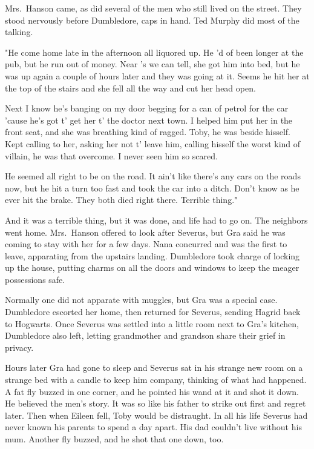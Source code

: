 Mrs.~Hanson came, as did several of the men who still lived on the street. They stood nervously before Dumbledore, caps in hand. Ted Murphy did most of the talking.

"He come home late in the afternoon all liquored up. He 'd of been longer at the pub, but he run out of money. Near 's we can tell, she got him into bed, but he was up again a couple of hours later and they was going at it. Seems he hit her at the top of the stairs and she fell all the way and cut her head open.

\textooquote Next I know he's banging on my door begging for a can of petrol for the car 'cause he's got t' get her t' the doctor next town. I helped him put her in the front seat, and she was breathing kind of ragged. Toby, he was beside hisself. Kept calling to her, asking her not t' leave him, calling hisself the worst kind of villain, he was that overcome. I never seen him so scared.

\textooquote He seemed all right to be on the road. It ain't like there's any cars on the roads now, but he hit a turn too fast and took the car into a ditch. Don't know as he ever hit the brake. They both died right there. Terrible thing."

And it was a terrible thing, but it was done, and life had to go on. The neighbors went home. Mrs.~Hanson offered to look after Severus, but Gra said he was coming to stay with her for a few days. Nana concurred and was the first to leave, apparating from the upstairs landing. Dumbledore took charge of locking up the house, putting charms on all the doors and windows to keep the meager possessions safe.

Normally one did not apparate with muggles, but Gra was a special case. Dumbledore escorted her home, then returned for Severus, sending Hagrid back to Hogwarts. Once Severus was settled into a little room next to Gra's kitchen, Dumbledore also left, letting grandmother and grandson share their grief in privacy.

Hours later Gra had gone to sleep and Severus sat in his strange new room on a strange bed with a candle to keep him company, thinking of what had happened. A fat fly buzzed in one corner, and he pointed his wand at it and shot it down. He believed the men's story. It was so like his father to strike out first and regret later. Then when Eileen fell, Toby would be distraught. In all his life Severus had never known his parents to spend a day apart. His dad couldn't live without his mum. Another fly buzzed, and he shot that one down, too.

